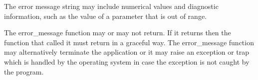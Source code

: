\documentclass[forwardcom.tex]{subfiles}
\begin{document}
The error message string may include numerical values and diagnostic information, such as the value of a parameter that is out of range.
\vspace{2mm}

The error\_message function may or may not return. If it returns then the function that called it must return in a graceful way. The error\_message function may alternatively terminate the application or it may raise an exception or trap which is handled by the operating system in case the exception is not caught by the program. 
\vspace{2mm}

 
\end{document}
